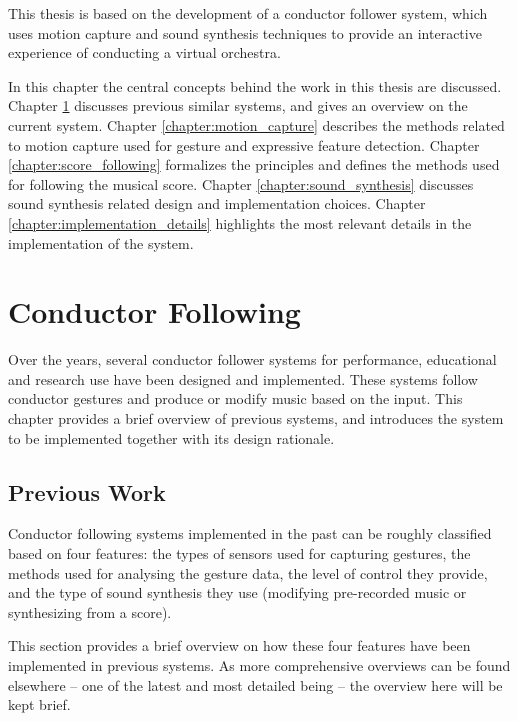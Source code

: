 This thesis is based on the development of
a conductor follower system,
which uses motion capture and sound synthesis techniques
to provide an interactive experience of conducting a virtual orchestra.

In this chapter the central concepts behind
the work in this thesis are discussed.
Chapter \ref{chapter:conductor_following} discusses
previous similar systems, and gives an overview on the current system.
Chapter \ref{chapter:motion_capture} describes the
methods related to motion capture used for
gesture and expressive feature detection.
Chapter \ref{chapter:score_following}
formalizes the principles
and defines the methods used for following the musical score.
Chapter \ref{chapter:sound_synthesis}
discusses sound synthesis related design and
implementation choices.
Chapter \ref{chapter:implementation_details}
highlights the most relevant details
in the implementation of the system.

\chapter{Conductor Following}
\label{chapter:conductor_following}

Over the years, several conductor follower systems for
performance, educational and research use have been designed and implemented.
These systems follow conductor gestures
and produce or modify music based on the input.
This chapter provides a brief overview of previous systems,
and introduces the system to be implemented together with its design rationale.

\section{Previous Work}

Conductor following systems implemented in the past
can be roughly classified based on four features:
the types of sensors used for capturing gestures,
the methods used for analysing the gesture data,
the level of control they provide, and
the type of sound synthesis they use
(modifying pre-recorded music or synthesizing from a score).

This section provides a brief overview on how these four features
have been implemented in previous systems.
As more comprehensive overviews can be found elsewhere --
one of the latest and most detailed being \cite{} --
the overview here will be kept brief.

